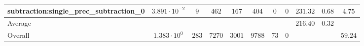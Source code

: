 \begin{tabular}{|l|c|c|c|c|c|c|c|c|c|c|}
subtraction:single\_prec\_subtraction\_0         & $ 3.891 \cdot 10^{-2} $ & $ 9      $ & $ 462  $ & $ 167  $ & $ 404   $ & $ 0  $ & $ 0 $ & $ 231.32      $ & $ 0.68    $ & $ 4.75    $ \\
\hline
Average                                          & $                     $ & $        $ & $      $ & $      $ & $       $ & $    $ & $   $ & $ 216.40      $ & $ 0.32    $ & $         $ \\
\hline
Overall                                          & $ 1.383 \cdot 10^{0}  $ & $ 283    $ & $ 7270 $ & $ 3001 $ & $ 9788  $ & $ 73 $ & $ 0 $ & $             $ & $         $ & $ 59.24   $ \\
\hline
\end{tabular}
